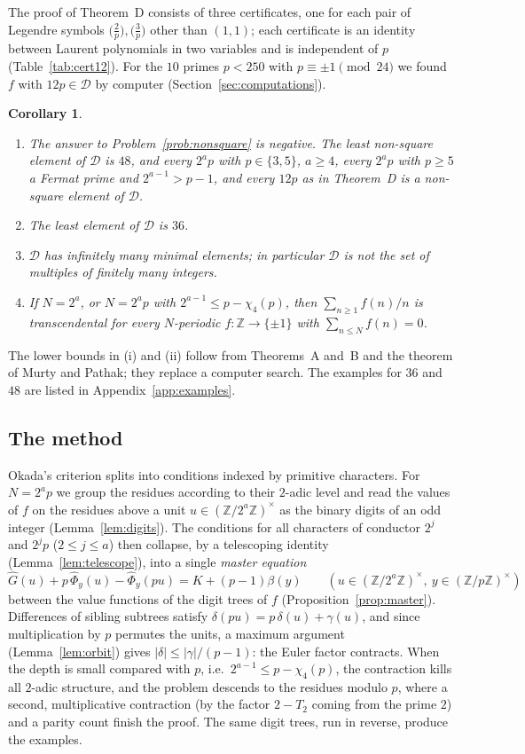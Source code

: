 \documentclass[11pt,a4paper]{article}
\newtheorem{corollary}[theorem]{Corollary}
\theoremstyle{definition}
\theoremstyle{remark}
\newcommand{\Z}{\mathbb{Z}}
\newcommand{\cD}{\mathcal{D}}
\newcommand{\Ga}{\widehat G}
\newcommand{\Ph}{\widehat\Phi}
\begin{document}
The proof of Theorem~D consists of three certificates, one for each pair of Legendre symbols $\bigl(\tfrac2p\bigr),\bigl(\tfrac3p\bigr)$ other than $(1,1)$; each certificate is an identity between Laurent polynomials in two variables and is independent of $p$ (Table~\ref{tab:cert12}). For the $10$ primes $p<250$ with $p\equiv\pm1\pmod{24}$ we found $f$ with $12p\in\cD$ by computer (Section~\ref{sec:computations}).

\begin{corollary}\label{cor:intro}
\begin{enumerate}[label=\textup{(\roman*)}]
\item The answer to Problem~\ref{prob:nonsquare} is negative. The least non-square element of $\cD$ is $48$, and every $2^ap$ with $p\in\{3,5\}$, $a\ge4$, every $2^ap$ with $p\ge5$ a Fermat prime and $2^{a-1}>p-1$, and every $12p$ as in Theorem~D is a non-square element of $\cD$.
\item The least element of $\cD$ is $36$.
\item $\cD$ has infinitely many minimal elements; in particular $\cD$ is not the set of multiples of finitely many integers.
\item If $N=2^a$, or $N=2^ap$ with $2^{a-1}\le p-\chi_4(p)$, then $\sum_{n\ge1}f(n)/n$ is transcendental for every $N$-periodic $f\colon\Z\to\{\pm1\}$ with $\sum_{n\le N}f(n)=0$.
\end{enumerate}
\end{corollary}

The lower bounds in (i) and (ii) follow from Theorems~A and~B and the theorem of Murty and Pathak; they replace a computer search. The examples for $36$ and $48$ are listed in Appendix~\ref{app:examples}.

\subsection{The method}
Okada's criterion splits into conditions indexed by primitive characters. For $N=2^ap$ we group the residues according to their $2$-adic level and read the values of $f$ on the residues above a unit $u\in(\Z/2^a\Z)^\times$ as the binary digits of an odd integer (Lemma~\ref{lem:digits}). The conditions for all characters of conductor $2^j$ and $2^jp$ ($2\le j\le a$) then collapse, by a telescoping identity (Lemma~\ref{lem:telescope}), into a single \emph{master equation}
\[
\Ga(u)+p\,\Ph_y(u)-\Ph_y(pu)=K+(p-1)\beta(y)\qquad(u\in(\Z/2^a\Z)^\times,\ y\in(\Z/p\Z)^\times)
\]
between the value functions of the digit trees of $f$ (Proposition~\ref{prop:master}). Differences of sibling subtrees satisfy $\delta(pu)=p\,\delta(u)+\gamma(u)$, and since multiplication by $p$ permutes the units, a maximum argument (Lemma~\ref{lem:orbit}) gives $|\delta|\le|\gamma|/(p-1)$: the Euler factor contracts. When the depth is small compared with $p$, i.e.\ $2^{a-1}\le p-\chi_4(p)$, the contraction kills all $2$-adic structure, and the problem descends to the residues modulo $p$, where a second, multiplicative contraction (by the factor $2-T_2$ coming from the prime $2$) and a parity count finish the proof. The same digit trees, run in reverse, produce the examples.
\end{document}
